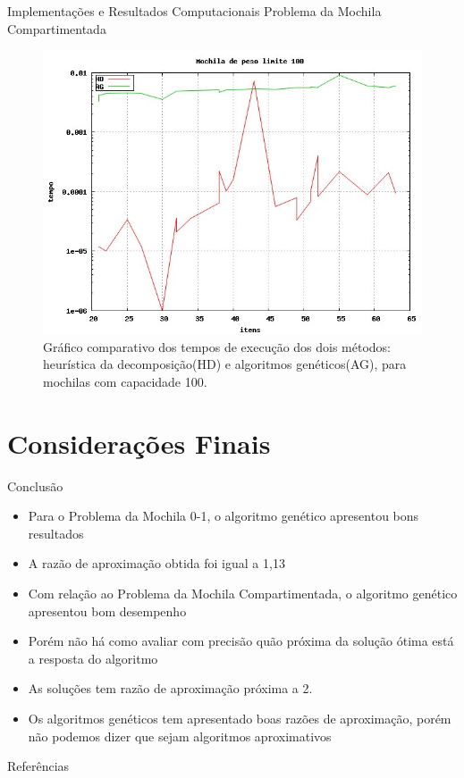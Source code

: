 \documentclass[slidestop,compress,mathserif]{beamer}
\begin{document}
\begin{frame} {Implementações e Resultados Computacionais} {Problema da Mochila Compartimentada}

\scriptsize
\begin{figure}[htp]
	\centering
	\includegraphics[scale=0.3]{images/com_w100.jpg}
	\caption{\tiny{Gráfico comparativo dos tempos de execução dos dois métodos: heurística da decomposição(HD) e algoritmos genéticos(AG), para mochilas com capacidade 100.}}
\end{figure}

\end{frame}


\section{Considerações Finais}
\begin{frame} {Conclusão}

\begin{itemize}
\item Para o Problema da Mochila 0-1, o algoritmo genético apresentou bons resultados
\item A razão de aproximação obtida foi igual a 1,13
\item Com relação ao Problema da Mochila Compartimentada, o algoritmo genético apresentou bom desempenho
\item Porém não há como avaliar com precisão quão próxima da solução ótima está a resposta do algoritmo
\item As soluções tem razão de aproximação próxima a 2.
\item Os algoritmos genéticos tem apresentado boas razões de aproximação, porém não podemos dizer que sejam algoritmos aproximativos
\end{itemize}

\end{frame}

\begin{frame}[allowframebreaks]{Referências}

\scriptsize
\nocite{*}


\end{frame}
\end{document}
